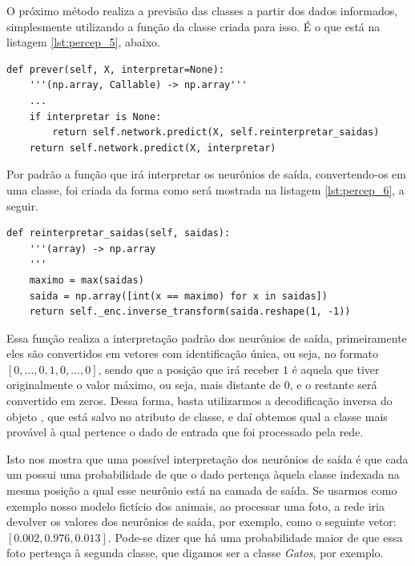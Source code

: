 O próximo método realiza a previsão das classes a partir dos dados informados, simplesmente utilizando a função da classe  criada para isso. É o que está na listagem \ref{lst:percep_5}, abaixo. 
\newline
\estiloR
\begin{lstlisting}[caption={Trecho da classe \eng{Perceptron}}, label={lst:percep_5}, escapeinside={\%}]
def prever(self, X, interpretar=None):
    '''(np.array, Callable) -> np.array'''
    ...
    if interpretar is None:
        return self.network.predict(X, self.reinterpretar_saidas)
    return self.network.predict(X, interpretar)
\end{lstlisting}


Por padrão a função que irá interpretar os neurônios de saída, convertendo-os em uma classe, foi criada da forma como será mostrada na listagem \ref{lst:percep_6}, a seguir.
\newline
\estiloR
\begin{lstlisting}[caption={Trecho da classe \eng{Perceptron}}, label={lst:percep_6}, escapeinside={\%}]
def reinterpretar_saidas(self, saidas):
    '''(array) -> np.array
    '''
    maximo = max(saidas)
    saida = np.array([int(x == maximo) for x in saidas])
    return self._enc.inverse_transform(saida.reshape(1, -1))
\end{lstlisting}


Essa função realiza a interpretação padrão dos neurônios de saída, primeiramente eles são convertidos em vetores com identificação única, ou seja, no formato $[0, \ldots,0, 1, 0, \ldots, 0]$, sendo que a posição que irá receber $1$ é aquela que tiver originalmente o valor máximo, ou seja, mais distante de $0$, e o restante será convertido em zeros. Dessa forma, basta utilizarmos a decodificação inversa do objeto , que está salvo no atributo de classe, e daí obtemos qual a classe mais provável à qual pertence o dado de entrada que foi processado pela rede.

Isto nos mostra que uma possível interpretação dos neurônios de saída é que cada um possui uma probabilidade de que o dado pertença àquela classe indexada na mesma posição a qual esse neurônio está na camada de saída. Se usarmos como exemplo nosso modelo fictício dos animais, ao processar uma foto, a rede iria devolver os valores dos neurônios de saída, por exemplo, como o seguinte vetor: $[0.002, 0.976, 0.013]$. Pode-se dizer que há uma probabilidade maior de que essa foto pertença à segunda classe, que digamos ser a classe \emph{Gatos}, por exemplo.

